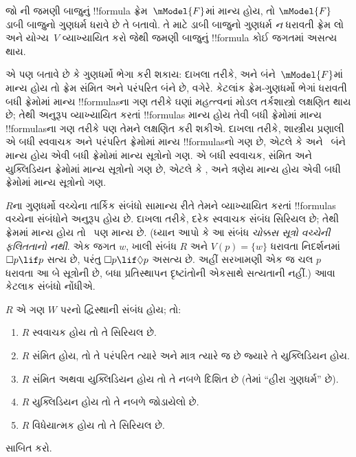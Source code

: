 \documentclass[../../../include/open-logic-section]{subfiles}
\begin{document}
\begin{prob}
જો ની જમણી
બાજુનું !!{formula} ફ્રેમ~$\mModel{F}$માં માન્ય હોય,
તો $\mModel{F}$ ડાબી બાજુનો ગુણધર્મ ધરાવે છે તે
બતાવો. તે માટે ડાબી બાજુનો ગુણધર્મ \emph{ન} ધરાવતી
ફ્રેમ લો અને યોગ્ય~$V$ વ્યાખ્યાયિત કરો જેથી
જમણી બાજુનું !!{formula} કોઈ જગતમાં અસત્ય થાય.
\end{prob}

 એ પણ બતાવે છે કે
ગુણધર્મો ભેગા કરી શકાય: દાખલા તરીકે, 
અને  બંને~$\mModel{F}$માં માન્ય હોય તો ફ્રેમ
સંમિત અને પરંપરિત બંને છે, વગેરે. કેટલાંક
ફ્રેમ-ગુણધર્મો ભેગાં ધરાવતી બધી ફ્રેમોમાં માન્ય
!!{formula}sના ગણ તરીકે ઘણાં મહત્ત્વનાં મોડલ
તર્કશાસ્ત્રો લક્ષણિત થાય છે; તેથી અનુરૂપ વ્યાખ્યાયિત
કરતાં !!{formula}s માન્ય હોય તેવી બધી ફ્રેમોમાં
માન્ય !!{formula}sના ગણ તરીકે પણ તેમને લક્ષણિત
કરી શકીએ. દાખલા તરીકે, શાસ્ત્રીય પ્રણાલી
 એ બધી સ્વવાચક અને પરંપરિત ફ્રેમોમાં
માન્ય !!{formula}sનો ગણ છે, એટલે કે 
અને~ બંને માન્ય હોય એવી બધી ફ્રેમોમાં
માન્ય સૂત્રોનો ગણ.  એ બધી સ્વવાચક,
સંમિત અને યુક્લિડિયન ફ્રેમોમાં માન્ય સૂત્રોનો ગણ છે,
એટલે કે ,  અને  ત્રણેય
માન્ય હોય એવી બધી ફ્રેમોમાં માન્ય સૂત્રોનો ગણ.

$R$ના ગુણધર્મો વચ્ચેના તાર્કિક સંબંધો સામાન્ય રીતે
તેમને વ્યાખ્યાયિત કરતાં !!{formula}s વચ્ચેના સંબંધોને
અનુરૂપ હોય છે. દાખલા તરીકે, દરેક સ્વવાચક સંબંધ
સિરિયલ છે; તેથી ફ્રેમમાં  માન્ય હોય તો~
પણ માન્ય છે. (ધ્યાન આપો કે આ સંબંધ
\emph{ચોક્કસ સૂત્રો વચ્ચેની ફલિતતાનો નથી}.
એક જગત $w$, ખાલી સંબંધ $R$ અને $V(p)=\{w\}$
ધરાવતા નિદર્શનમાં $\Box p \lif p$ સત્ય છે,
પરંતુ $\Box p \lif \Diamond p$ અસત્ય છે.
અહીં સરખામણી એક જ ચલ $p$ ધરાવતા આ બે સૂત્રોની છે,
બધા પ્રતિસ્થાપન દૃષ્ટાંતોની એકસાથે સત્યતાની નહીં.)
આવા કેટલાક સંબંધો નોંધીએ.

\begin{prop}
  $R$ એ ગણ $W$ પરનો દ્વિસ્થાની સંબંધ હોય; તો:
  \begin{enumerate}
  \item $R$ સ્વવાચક હોય તો તે સિરિયલ છે.
  \item $R$ સંમિત હોય, તો તે પરંપરિત ત્યારે અને માત્ર
    ત્યારે જ છે જ્યારે તે યુક્લિડિયન હોય.
  \item $R$ સંમિત અથવા યુક્લિડિયન હોય તો તે
    નબળે દિશિત છે (તેમાં ``હીરા ગુણધર્મ'' છે).
  \item $R$ યુક્લિડિયન હોય તો તે નબળે જોડાયેલો છે.
  \item $R$ વિધેયાત્મક હોય તો તે સિરિયલ છે.
  \end{enumerate}
\end{prop}

\begin{prob}
   સાબિત કરો.
\end{prob}
\end{document}

